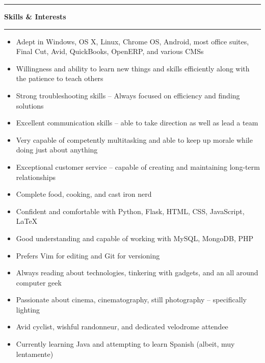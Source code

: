 \documentclass[10pt,letterpaper]{article}			%
\newcommand{
    \sectionHeader}[1]{
    \hrule
    \vspace{0.2em}
    {\large \textbf {#1}}
    \vspace{0.2em}
    \hrule
    \vspace{0.2em}
    }
\begin{document}
\sectionHeader{Skills \& Interests}

\begin{minipage}[t]{0.49\textwidth}	
	\begin{itemize}
	    \item Adept in Windows, OS X, Linux, Chrome OS, Android, most office suites, \mbox{Final} Cut, Avid, QuickBooks, OpenERP, and various CMSs 
	    \item Willingness and ability to learn new things and skills efficiently along with the patience to teach others
	    \item Strong troubleshooting skills -- Always focused on efficiency and finding solutions
	    \item Excellent communication skills -- able to take direction as well as lead a team
	    \item Very capable of competently multitasking and able to keep up morale while doing just about anything
	    \item Exceptional customer service -- capable of creating and maintaining long-term relationships
	    \item Complete food, cooking, and cast iron nerd
	\end{itemize}
\end{minipage}
\begin{minipage}[t]{0.49\textwidth}
	\begin{itemize}
	    \item Confident and comfortable with Python, Flask, HTML, CSS, JavaScript, \LaTeX
	    \item Good understanding and capable of working with MySQL, MongoDB, PHP
	    \item Prefers Vim for editing and Git for versioning
	    \item Always reading about technologies, tinkering with gadgets, and an all around computer geek
	    \item Passionate about cinema, cinematography, still photography -- specifically lighting
	    \item Avid cyclist, wishful randonneur, and dedicated velodrome attendee
        \item Currently learning Java and attempting to learn Spanish (albeit, muy lentamente)
	\end{itemize}
\end{minipage}
\end{document}
